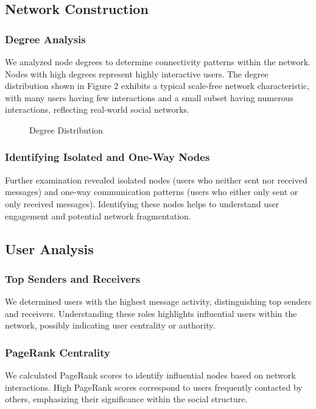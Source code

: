 \subsection{Network Construction}

\subsubsection{Degree Analysis}
We analyzed node degrees to determine connectivity patterns within the network. Nodes with high degrees represent highly interactive users. The degree distribution shown in Figure 2 exhibits a typical scale-free network characteristic, with many users having few interactions and a small subset having numerous interactions, reflecting real-world social networks.

\begin{figure}[h]
\centering
\caption{Degree Distribution}
\label{fig:degree_distribution}
\end{figure}

\subsubsection{Identifying Isolated and One-Way Nodes}
Further examination revealed isolated nodes (users who neither sent nor received messages) and one-way communication patterns (users who either only sent or only received messages). Identifying these nodes helps to understand user engagement and potential network fragmentation.

\subsection{User Analysis}

\subsubsection{Top Senders and Receivers}
We determined users with the highest message activity, distinguishing top senders and receivers. Understanding these roles highlights influential users within the network, possibly indicating user centrality or authority.

\subsubsection{PageRank Centrality}
We calculated PageRank scores to identify influential nodes based on network interactions. High PageRank scores correspond to users frequently contacted by others, emphasizing their significance within the social structure.


